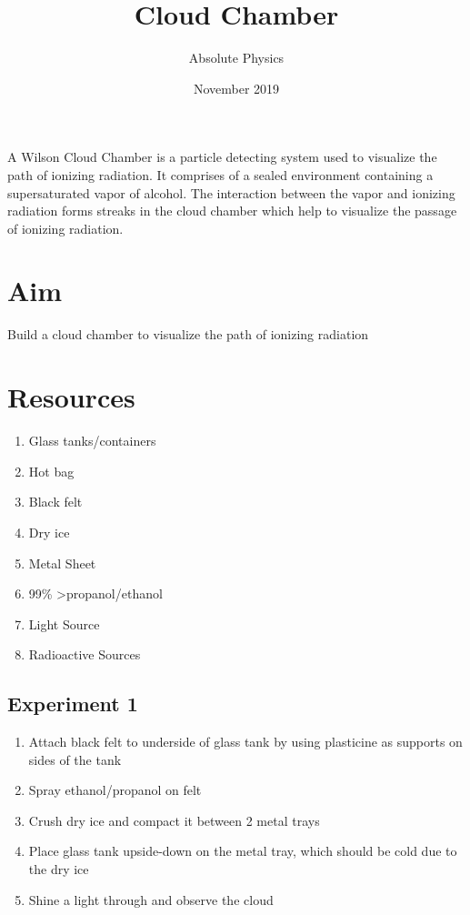 \documentclass{article}
\title{Cloud Chamber}
\author{Absolute Physics }
\date{{\large November 2019}}
\begin{document}
\maketitle
\large{ A Wilson Cloud Chamber is a particle detecting system used to visualize the path of ionizing radiation. It comprises of a sealed environment containing a supersaturated vapor of alcohol. The interaction between the vapor and ionizing radiation forms streaks in the cloud chamber which help to visualize the passage of ionizing radiation.}
\section*{Aim}
\large{Build a cloud chamber to visualize the path of ionizing radiation}
\section*{Resources}
\large{\begin{enumerate}
  \item Glass tanks/containers
  \item Hot bag
  \item Black felt
  \item Dry ice
  \item Metal Sheet
  \item 99\% \textgreater propanol/ethanol
  \item Light Source
  \item Radioactive Sources
\end{enumerate}}

\begin{center}
\section*{Experiment 1}
\end{center}
\large{\begin{enumerate}
    \item Attach black felt to underside of glass tank by using plasticine as supports on sides of the tank
    \item Spray ethanol/propanol on felt
    \item Crush dry ice and compact it between 2 metal trays
    \item Place glass tank upside-down on the metal tray, which should be cold due to the dry ice
    \item Shine a light through and observe the cloud
\end{enumerate}}
\end{document}
